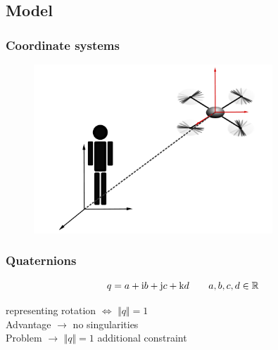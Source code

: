 	\begin{frame}
		\section{Model}
		\frametitle{Coordinate systems}
			\begin{figure}[p]
				\centering
				\includegraphics[width=0.8\textwidth]{images/Koordinatensysteme.pdf}
				\label{fig:Koordinatensysteme}
		\end{figure}
	\end{frame}

	
	\begin{frame}
		\frametitle{Quaternions}
		\begin{block}{}
			\[ q = a + \textup{i}b+\textup{j}c+\textup{k}d \qquad a, b, c, d \in \mathbb{R} \]
			\end{block}
			\vspace{1em}
			representing rotation \( \Leftrightarrow \) \( \Vert q \Vert = 1 \) \\
			\vspace{1em}			
			Advantage \(\rightarrow\) no singularities \\
			\vspace{1em}
			Problem \(\rightarrow\) \( \Vert q \Vert = 1 \) additional constraint
	\end{frame}
	

